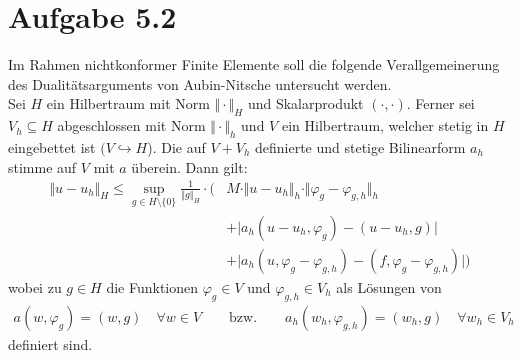 \documentclass[12pt,a4paper]{article}
\begin{document}
\section*{Aufgabe 5.2}
Im Rahmen nichtkonformer Finite Elemente soll die folgende Verallgemeinerung des Dualitätsarguments von Aubin-Nitsche untersucht werden.\\
Sei $H$ ein Hilbertraum mit Norm $\Vert\cdot\Vert_H$ und Skalarprodukt $(\cdot,\cdot)$. Ferner sei $V_h\subseteq H$ abgeschlossen mit Norm $\Vert\cdot\Vert_h$ und $V$ ein Hilbertraum, welcher stetig in $H$ eingebettet ist $(V\hookrightarrow H$). Die auf $V+V_h$ definierte und stetige Bilinearform $a_h$ stimme auf $V$ mit $a$ überein. Dann gilt:
\begin{align*}
\Vert u-u_h\Vert_H\leq\sup\limits_{g\in H\setminus\lbrace0\rbrace}\frac{1}{\Vert g\Vert_H}\cdot\Big( &M\cdot\Vert u-u_h\Vert_h\cdot\Vert\varphi_g-\varphi_{g,h}\Vert_h\\
&+\big|a_h(u-u_h,\varphi_g)-(u-u_h,g)\big|\\
&+\big|a_h(u,\varphi_g-\varphi_{g,h})-(f,\varphi_g-\varphi_{g,h})\big|\Big)
\end{align*}
wobei zu $g\in H$ die Funktionen $\varphi_g\in V$ und $\varphi_{g,h}\in V_h$ als Lösungen von
\begin{align*}
a(w,\varphi_g)=(w,g)\quad\forall w\in V\qquad\text{bzw.}\qquad a_h(w_h,\varphi_{g,h})=(w_h,g)\quad\forall w_h\in V_h
\end{align*}
definiert sind.
\end{document}
